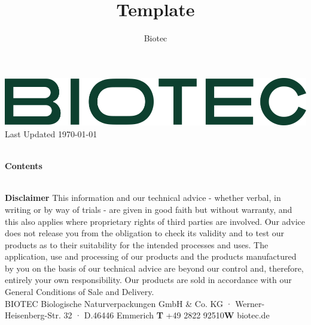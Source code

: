 \documentclass{article}
\title{Template}
\author{Biotec}
\begin{document}
\begin{flushleft}
	\includegraphics[scale=0.20]{biotec}
	\hfill\tiny Last Updated \today
\end{flushleft}
\begin{flushleft}
	\hspace{1cm}\\
	\textbf{Contents}\\
	\hspace{5in}\\
	\begin{enumerate}

	\end{enumerate}
\end{flushleft}
\vspace*{\fill}
{\scriptsize
	\textbf{Disclaimer} This information and our technical advice - whether verbal, in writing or by way of trials - are given in good faith but without warranty, and this also applies where proprietary rights of third parties are involved. Our advice does not release you from the obligation to check its validity and to test our products as to their suitability for the intended processes and uses. The application, use and processing of our products and the products manufactured by you on the basis of our technical advice are beyond our control and, therefore, entirely your own responsibility. Our products are sold in accordance with our General Conditions of Sale and Delivery.\\
	BIOTEC Biologische Naturverpackungen GmbH \& Co. KG · Werner-Heisenberg-Str. 32 · D.46446 Emmerich \hfill \textbf{T} +49 2822 92510\qquad \textbf{W} biotec.de}
\clearpage
\end{document}
